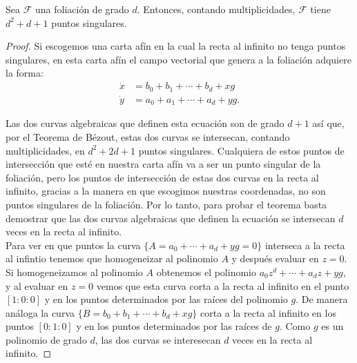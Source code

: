\begin{Teorema}
\label{Teo:NumeroDeSingularidades}
Sea $\mathcal{F}$ una foliación de grado $d$. Entonces, contando multiplicidades, $\mathcal{F}$ tiene $d^{2}+d+1$ puntos singulares.
\end{Teorema}

\begin{proof}
Si escogemos una carta afín en la cual la recta al infinito no tenga puntos singulares, en esta carta afín el campo vectorial que genera a la foliación adquiere la forma:
\begin{equation*}
\begin{aligned}
\dot{x} &= b_{0}+b_{1}+\cdots+b_{d}+xg\\
\dot{y} &= a_{0}+a_{1}+\cdots+a_{d}+yg.
\end{aligned}
\end{equation*}

Las dos curvas algebraicas que definen esta ecuación son de grado $d+1$ así que, por el Teorema de Bézout, estas dos curvas se intersecan, contando multiplicidades,  en $d^{2}+2d+1$ puntos singulares. Cualquiera de estos puntos de intersección que esté en nuestra carta afín va a ser un punto singular de la foliación, pero los puntos de intersección de estas dos curvas en la recta al infinito, gracias a la manera en que escogimos nuestras coordenadas, no son puntos singulares de la foliación. Por lo tanto, para probar el teorema basta demostrar que las dos curvas algebraicas que definen la ecuación se intersecan $d$ veces en la recta al infinito.\\

Para ver en que puntos la curva $\{A=a_{0}+\cdots+a_{d}+yg=0\}$ interseca a la recta al infintio tenemos que homogeneizar al polinomio $A$ y después evaluar en $z=0$. Si homogeneizamos al polinomio $A$ obtenemos el polinomio $a_{0}z^{d}+\cdots+a_{d}z+yg$, y al evaluar en $z=0$ vemos que esta curva corta a la recta al infinito en el punto $[1:0:0]$ y en los puntos determinados por las raíces del polinomio $g$. De manera análoga la curva $\{B=b_{0}+b_{1}+\cdots+b_{d}+xg\}$ corta a la recta al infinito en los puntos $[0:1:0]$ y en los puntos determinados por las raíces de $g$. Como $g$ es un polinomio de grado $d$, las dos curvas se interesecan $d$ veces en la recta al infinito.

\end{proof}
